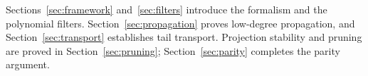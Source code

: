 Sections~\ref{sec:framework} and~\ref{sec:filters} introduce the
formalism and the polynomial filters. Section~\ref{sec:propagation}
proves low-degree propagation, and Section~\ref{sec:transport}
establishes tail transport. Projection stability and pruning are
proved in Section~\ref{sec:pruning}; Section~\ref{sec:parity}
completes the parity argument.
